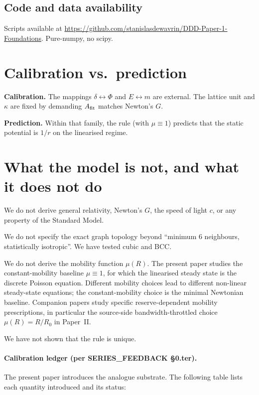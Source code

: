 \documentclass[11pt,a4paper]{article}
\begin{document}
\subsection{Code and data availability}

Scripts available at
\url{https://github.com/stanislasdewavrin/DDD-Paper-1-Foundations}.
Pure-numpy, no scipy.

\section{Calibration vs.\ prediction}
\label{sec:cal-vs-pred}

\textbf{Calibration.} The mappings $\delta \leftrightarrow \Phi$
and $E \leftrightarrow m$ are external. The lattice unit and
$\kappa$ are fixed by demanding $A_{\rm fit}$ matches Newton's
$G$.

\textbf{Prediction.} Within that family, the rule (with
$\mu \equiv 1$) predicts that the static potential is $1/r$ on
the linearised regime.

\section{What the model is not, and what it does not do}
\label{sec:not}

We do not derive general relativity, Newton's $G$, the speed
of light $c$, or any property of the Standard Model.

We do not specify the exact graph topology beyond ``minimum 6
neighbours, statistically isotropic''. We have tested cubic
and BCC.

We do not derive the mobility function $\mu(R)$. The present
paper studies the constant-mobility baseline $\mu \equiv 1$,
for which the linearised steady state is the discrete Poisson
equation. Different mobility choices lead to different
non-linear steady-state equations; the constant-mobility
choice is the minimal Newtonian baseline. Companion papers
study specific reserve-dependent mobility prescriptions, in
particular the source-side bandwidth-throttled choice
$\mu(R) = R/R_0$ in Paper~II.

We have not shown that the rule is unique.

\paragraph{Calibration ledger (per SERIES\_FEEDBACK §0.ter).}
The present paper introduces the analogue substrate. The
following table lists each quantity introduced and its status:
\end{document}
